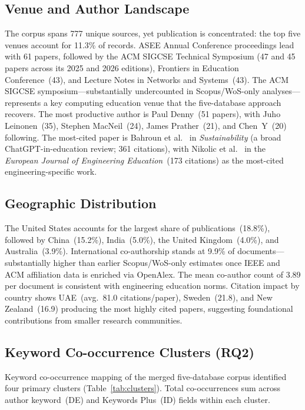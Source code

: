 \documentclass[conference]{IEEEtran}
\begin{document}
\subsection{Venue and Author Landscape}

The corpus spans 777 unique sources, yet publication is concentrated: the top five venues account
for 11.3\% of records. ASEE Annual Conference proceedings lead with 61 papers, followed by the
ACM SIGCSE Technical Symposium (47 and 45 papers across its 2025 and 2026 editions),
Frontiers in Education Conference~(43), and Lecture Notes in Networks and Systems~(43). The
ACM SIGCSE symposium---substantially undercounted in Scopus/WoS-only analyses---represents a
key computing education venue that the five-database approach recovers. The most productive
author is Paul Denny~(51 papers), with Juho Leinonen~(35), Stephen MacNeil~(24), James
Prather~(21), and Chen~Y~(20) following. The most-cited paper is Bahroun et al.~\cite{bahroun2023}
in \textit{Sustainability} (a broad ChatGPT-in-education review; 361 citations), with Nikolic
et al.~\cite{nikolic2023} in the \textit{European Journal of Engineering Education}~(173
citations) as the most-cited engineering-specific work.

\subsection{Geographic Distribution}

The United States accounts for the largest share of publications~(18.8\%), followed by
China~(15.2\%), India~(5.0\%), the United Kingdom~(4.0\%), and Australia~(3.9\%). International
co-authorship stands at 9.9\% of documents---substantially higher than earlier Scopus/WoS-only
estimates once IEEE and ACM affiliation data is enriched via OpenAlex. The mean co-author count
of 3.89 per document is consistent with engineering education norms. Citation impact by country
shows UAE~(avg.\ 81.0 citations/paper), Sweden~(21.8), and New Zealand~(16.9) producing the
most highly cited papers, suggesting foundational contributions from smaller research communities.

\subsection{Keyword Co-occurrence Clusters (RQ2)}

Keyword co-occurrence mapping of the merged five-database corpus identified four primary clusters
(Table~\ref{tab:clusters}). Total co-occurrences sum across author keyword~(DE) and Keywords
Plus~(ID) fields within each cluster.
\end{document}
